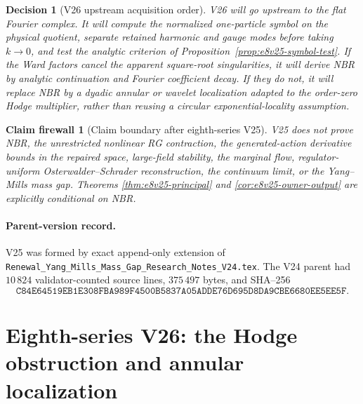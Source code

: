 \documentclass[11pt,oneside]{book}
\newtheorem{firewall}[theorem]{Claim firewall}
\newtheorem{decision}[theorem]{Decision}
\theoremstyle{definition}
\theoremstyle{remark}
\begin{document}
\begin{decision}[V26 upstream acquisition order]
\label{dec:e8v25-v26}
V26 will go upstream to the flat Fourier complex.  It will compute the
normalized one-particle symbol on the physical quotient, separate
retained harmonic and gauge modes before taking \(k\to0\), and test
the analytic criterion of
Proposition~\ref{prop:e8v25-symbol-test}.  If the Ward factors cancel
the apparent square-root singularities, it will derive NBR by analytic
continuation and Fourier coefficient decay.  If they do not, it will
replace NBR by a dyadic annular or wavelet localization adapted to the
order-zero Hodge multiplier, rather than reusing a circular
exponential-locality assumption.
\end{decision}

\begin{firewall}[Claim boundary after eighth-series V25]
\label{fire:e8v25-claim}
V25 does not prove NBR, the unrestricted nonlinear RG contraction,
the generated-action derivative bounds in the repaired space,
large-field stability, the marginal flow, regulator-uniform
Osterwalder--Schrader reconstruction, the continuum limit, or the
Yang--Mills mass gap.  Theorems
\ref{thm:e8v25-principal} and
\ref{cor:e8v25-owner-output} are explicitly conditional on NBR.
\end{firewall}

\paragraph{Parent-version record.}
V25 was formed by exact append-only extension of
\texttt{Renewal\_Yang\_Mills\_Mass\_Gap\_Research\_Notes\_V24.tex}.
The V24 parent had \(10\,824\) validator-counted source lines,
\(375\,497\) bytes, and SHA--256
\[
\texttt{C84E64519EB1E308FBA989F4500B5837A05ADDE76D695D8DA9CBE6680EE5EE5F}.
\]



\section{Eighth-series V26: the Hodge obstruction and annular
localization}
\end{document}
